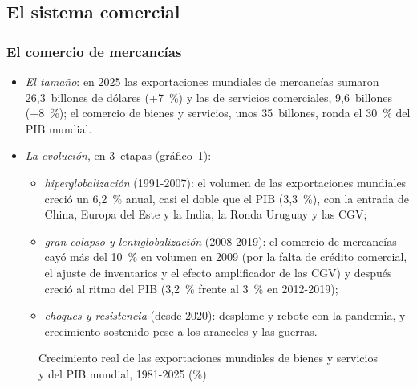 \documentclass[11pt]{article}
\begin{document}
\subsection{El sistema comercial}\label{sec:comercial}

\subsubsection{El comercio de mercancías}\label{sec:mercancias}

\begin{itemize}
\item \emph{El tamaño}: en 2025 las exportaciones mundiales de mercancías sumaron 26,3~billones de dólares (+7~\%) y las de servicios comerciales, 9,6~billones (+8~\%); el comercio de bienes y servicios, unos 35~billones, ronda el 30~\% del PIB mundial\nocite{OMC2026GTOS,UNCTAD2026GTU}.
\item \emph{La evolución}, en 3~etapas (gráfico~\ref{fig:comercio-pib}):
  \begin{itemize}
  \item \emph{hiperglobalización} (1991-2007): el volumen de las exportaciones mundiales creció un 6,2~\% anual, casi el doble que el PIB (3,3~\%), con la entrada de China, Europa del Este y la India, la Ronda Uruguay y las CGV;
  \item \emph{gran colapso y lentiglobalización} (2008-2019): el comercio de mercancías cayó más del 10~\% en volumen en 2009 (por la falta de crédito comercial, el ajuste de inventarios y el efecto amplificador de las CGV) y después creció al ritmo del PIB (3,2~\% frente al 3~\% en 2012-2019)\nocite{BM2026WDIComercio32,OMC2026GTO};
  \item \emph{choques y resistencia} (desde 2020): desplome y rebote con la pandemia, y crecimiento sostenido pese a los aranceles y las guerras\nocite{OMC2026PerspectivasOct}.
  \end{itemize}
\end{itemize}

\begin{figure}[H]
\centering
\caption{Crecimiento real de las exportaciones mundiales de bienes y servicios y del PIB mundial, 1981-2025 (\%)}\label{fig:comercio-pib}
\end{figure}
\end{document}
